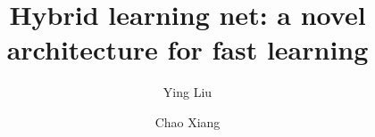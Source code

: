 \documentclass[3p,times,procedia]{elsarticle}
\begin{document}
\begin{frontmatter}




\title{Hybrid learning net: a novel architecture for fast learning}


\author{Ying Liu}
\author{Chao Xiang}

\address{University of Chinese Academy of Sciences, Beijing 100049, China}


\end{frontmatter}
\end{document}
